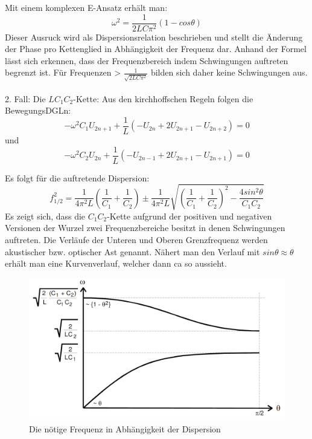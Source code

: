 Mit einem komplexen E-Ansatz erhält man:
\begin{equation}
\omega ^2 = \frac{1}{2LC\pi^2}(1-cos\theta)
\end{equation}
Dieser Ausruck wird als Dispersionsrelation beschrieben und stellt die Änderung
 der Phase pro Kettenglied in Abhängigkeit der Frequenz dar. Anhand der Formel lässt sich erkennen,
  dass der Frequenzbereich indem Schwingungen auftreten begrenzt ist. Für Frequenzen >
 $\frac{1}{\sqrt{2LC\pi^2}}$ bilden sich daher keine Schwingungen aus.\\\\

 2. Fall: Die $LC_1C_2$-Kette:
 Aus den kirchhoffschen Regeln folgen die BewegungsDGLn:
 \begin{equation}
   -\omega^2 C_1 U_{2n+1} + \frac{1}{L} \left( -U_{2n} + 2U_{2n+1} - U_{2n+2} \right) = 0
 \end{equation}
 und
 \begin{equation}
   -\omega^2 C_2 U_{2n} + \frac{1}{L} \left( -U_{2n-1} + 2U_{2n+1} - U_{2n+1} \right) = 0
 \end{equation}

Es folgt für die auftretende Dispersion:
\begin{equation}
  f_{1/2}^2 = \frac{1}{4\pi^2L}\left(\frac{1}{C_1}+\frac{1}{C_2}\right) \pm \frac{1}{4\pi^2L}\sqrt{\left(\frac{1}{C_1}+\frac{1}{C_2} \right)^2 - \frac{4 sin^2\theta}{C_1C_2}}
\end{equation}
Es zeigt sich, dass die $C_1C_2$-Kette aufgrund der positiven und negativen Versionen der Wurzel
zwei Frequenzbereiche besitzt in denen Schwingungen auftreten. Die Verläufe der Unteren und Oberen
 Grenzfrequenz werden akustischer bzw. optischer Ast genannt. Nähert man den Verlauf mit $sin \theta \approx \theta$ erhält man eine Kurvenverlauf, welcher dann ca so aussieht.

 \begin{figure}[H]
   \centering
   \includegraphics[width=\linewidth-200pt,height=\textheight-200pt,keepaspectratio]{content/Grafiken/Dispersionskurven.png}
   \caption{Die nötige Frequenz in Abhängigkeit der Dispersion}
   \label{fig:LC-Kette}
 \end{figure}


